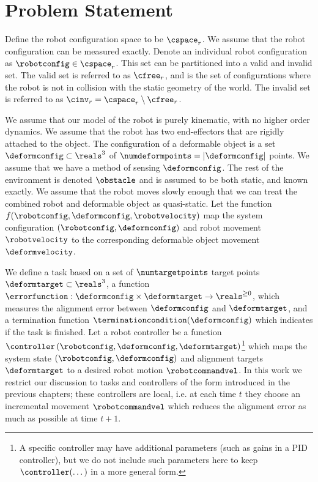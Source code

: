 \section{Problem Statement}
\label{sec:main_problem_statement}

Define the robot configuration space to be $\cspace_r$. We assume that the robot configuration can be measured exactly. Denote an individual robot configuration as $\robotconfig \in \cspace_r$. This set can be partitioned into a valid and invalid set. The valid set is referred to as $\cfree_r$, and is the set of configurations where the robot is not in collision with the static geometry of the world. The invalid set is referred to as $\cinv_r = \cspace_r \setminus \cfree_r$.

We assume that our model of the robot is purely kinematic, with no higher order dynamics. We assume that the robot has two end-effectors that are rigidly attached to the object. The configuration of a deformable object is a set $\deformconfig \subset \reals^3$ of $\numdeformpoints = | \deformconfig |$ points. We assume that we have a method of sensing $\deformconfig$. The rest of the environment is denoted $\obstacle$ and is assumed to be both static, and known exactly. We assume that the robot moves slowly enough that we can treat the combined robot and deformable object as quasi-static. Let the function $f(\robotconfig, \deformconfig, \robotvelocity)$ map the system configuration $(\robotconfig, \deformconfig)$ and robot movement $\robotvelocity$ to the corresponding deformable object movement $\deformvelocity$.

We define a task based on a set of $\numtargetpoints$ target points $\deformtarget \subset \reals^3$, a function $\errorfunction: \deformconfig \times \deformtarget \rightarrow \reals^{\geq 0}$, which measures the alignment error between $\deformconfig$ and $\deformtarget$, and a termination function $\terminationcondition (\deformconfig)$ which indicates if the task is finished. Let a robot controller be a function $\controller \left(\robotconfig, \deformconfig, \deformtarget \right)$\footnote{A specific controller may have additional parameters (such as gains in a PID controller), but we do not include such parameters here to keep $\controller(\dots)$ in a more general form.} which maps the system state $\left( \robotconfig, \deformconfig \right)$ and alignment targets $\deformtarget$ to a desired robot motion $\robotcommandvel$. In this work we restrict our discussion to tasks and controllers of the form introduced in the previous chapters; these controllers are local, i.e. at each time $t$ they choose an incremental movement $\robotcommandvel$ which reduces the alignment error as much as possible at time $t + 1$. 

